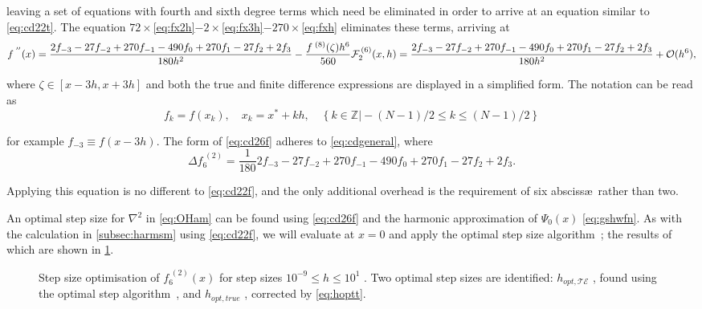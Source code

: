 leaving a set of equations with fourth and sixth degree terms which need be eliminated in order to arrive at an equation similar to \cref{eq:cd22t}.
The equation $72\times$\cref{eq:fx2h}$-2\times$\cref{eq:fx3h}$-270\times$\cref{eq:fxh} eliminates these terms, arriving at
{\mathindent=0.3cm
\begin{equation}
f^{\;''}(x) = \frac{2f_{-3}-27f_{-2}+270f_{-1}-490f_{0}+270f_{1}-27f_{2}+2f_{3}}{180h^{2}}-\frac{f^{\;(8)}(\zeta)h^6}{560}\label{eq:cd26t}\\
\mathcal{F}_2^{\,(6)}(x,h) = \frac{2f_{-3}-27f_{-2}+270f_{-1}-490f_{0}+270f_{1}-27f_{2}+2f_{3}}{180h^{2}} + \mathcal{O}(h^6),\label{eq:cd26f}
\end{equation}
}

where $\zeta \in [x-3h,x+3h]$ and both the true and finite difference expressions are displayed in a simplified form.
The notation can be read as
\begin{equation}
f_k = f(x_k), \quad x_k=x^*+kh, \quad \left\{k \in \mathbb{Z} \vert -(N-1)/2 \leq k \leq  (N-1)/2 \right\}
\end{equation}

for example $f_{-3} \equiv f(x-3h)$.
The form of \cref{eq:cd26f} adheres to \cref{eq:cdgeneral}, where
\begin{equation}
\Delta f_6^{\;(2)} = \frac{1}{180}2f_{-3}-27f_{-2}+270f_{-1}-490f_{0}+270f_{1}-27f_{2}+2f_{3}.\label{eq:f62x}
\end{equation}

Applying this equation is no different to \cref{eq:cd22f}, and the only additional overhead is the requirement of six absciss\ae\ rather than two.

An optimal step size for $\nabla^2$ in \cref{eq:OHam} can be found using  \cref{eq:cd26f} and the harmonic approximation of $\Psi_0(x)$ \cref{eq:gshwfn}.
As with the calculation in \cref{subsec:harmsm} using \cref{eq:cd22f}, we will evaluate at $x = 0$ and apply the optimal step size algorithm~\cite{Mathur2012}; the results of which are shown in \cref{fig:hopt7pt}.
\begin{figure}[htp]
\centering
\resizebox{\textwidth}{!}{}
\caption[Step size optimisation of $f_2^{\;(6)}(x)$]{\label{fig:hopt7pt}Step size optimisation of $f_6^{\;(2)}(x)$ for step sizes $10^{-9}\!\leq\! h\! \leq\! 10^1$ . Two optimal step sizes are identified: $h_{opt,\mathcal{TE}}$ , found using the optimal step algorithm~\cite{Mathur2012}, and $h_{opt,true}$ , corrected by \cref{eq:hoptt}.}
\end{figure}

